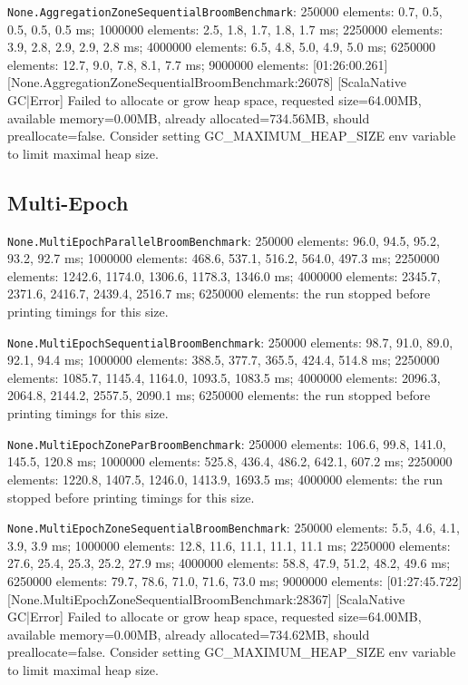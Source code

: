 \documentclass[
  english,   %
  bibtex,    %
]{kththesis}
\begin{document}
\texttt{None.AggregationZoneSequentialBroomBenchmark}: 250000 elements: 0.7,
0.5, 0.5, 0.5, 0.5 ms; 1000000 elements: 2.5, 1.8, 1.7, 1.8, 1.7 ms; 2250000
elements: 3.9, 2.8, 2.9, 2.9, 2.8 ms; 4000000 elements: 6.5, 4.8, 5.0, 4.9,
5.0 ms; 6250000 elements: 12.7, 9.0, 7.8, 8.1, 7.7 ms; 9000000 elements:
[01:26:00.261] [None.AggregationZoneSequentialBroomBenchmark:26078] [ScalaNative GC|Error] Failed to allocate or grow heap space, requested size=64.00MB, available memory=0.00MB, already allocated=734.56MB, should preallocate=false. Consider setting GC_MAXIMUM_HEAP_SIZE env variable to limit maximal heap size.

\subsection{Multi-Epoch}

\texttt{None.MultiEpochParallelBroomBenchmark}: 250000 elements: 96.0, 94.5,
95.2, 93.2, 92.7 ms; 1000000 elements: 468.6, 537.1, 516.2, 564.0, 497.3 ms;
2250000 elements: 1242.6, 1174.0, 1306.6, 1178.3, 1346.0 ms; 4000000
elements: 2345.7, 2371.6, 2416.7, 2439.4, 2516.7 ms; 6250000 elements:
the run stopped before printing timings for this size.

\texttt{None.MultiEpochSequentialBroomBenchmark}: 250000 elements: 98.7, 91.0,
89.0, 92.1, 94.4 ms; 1000000 elements: 388.5, 377.7, 365.5, 424.4, 514.8 ms;
2250000 elements: 1085.7, 1145.4, 1164.0, 1093.5, 1083.5 ms; 4000000
elements: 2096.3, 2064.8, 2144.2, 2557.5, 2090.1 ms; 6250000 elements: the run
stopped before printing timings for this size.

\texttt{None.MultiEpochZoneParBroomBenchmark}: 250000 elements: 106.6, 99.8,
141.0, 145.5, 120.8 ms; 1000000 elements: 525.8, 436.4, 486.2, 642.1, 607.2
ms; 2250000 elements: 1220.8, 1407.5, 1246.0, 1413.9, 1693.5 ms; 4000000
elements: the run stopped before printing timings for this size.

\texttt{None.MultiEpochZoneSequentialBroomBenchmark}: 250000 elements: 5.5, 4.6,
4.1, 3.9, 3.9 ms; 1000000 elements: 12.8, 11.6, 11.1, 11.1, 11.1 ms; 2250000
elements: 27.6, 25.4, 25.3, 25.2, 27.9 ms; 4000000 elements: 58.8, 47.9, 51.2,
48.2, 49.6 ms; 6250000 elements: 79.7, 78.6, 71.0, 71.6, 73.0 ms; 9000000
elements: [01:27:45.722] [None.MultiEpochZoneSequentialBroomBenchmark:28367] [ScalaNative GC|Error] Failed to allocate or grow heap space, requested size=64.00MB, available memory=0.00MB, already allocated=734.62MB, should preallocate=false. Consider setting GC_MAXIMUM_HEAP_SIZE env variable to limit maximal heap size.
\end{document}
